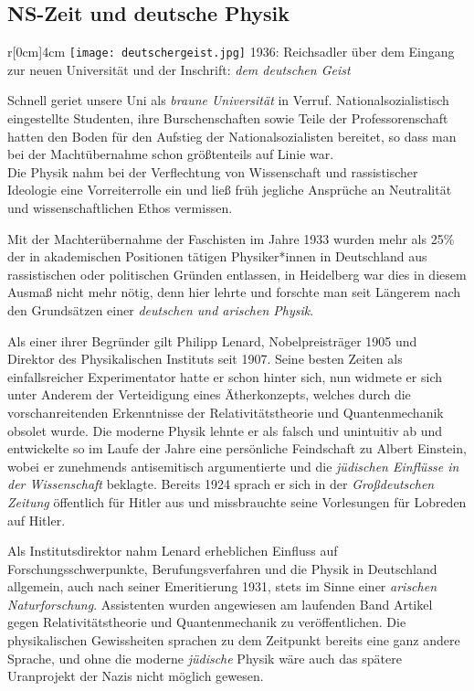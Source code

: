 \subsection*{NS-Zeit und deutsche Physik}
\begin{wrapfigure}{r}[0cm]{4cm}
\vspace{-13pt}
\texttt{[image: deutschergeist.jpg]}
\small{1936: Reichsadler über dem Eingang zur neuen Universität und der Inschrift: \textit{dem deutschen Geist}}
\vspace{-15pt}
\end{wrapfigure}

Schnell geriet unsere Uni als \textit{braune Universität} in Verruf. Nationalsozialistisch eingestellte Studenten, ihre Burschenschaften sowie Teile der Professorenschaft hatten den Boden für den Aufstieg der Nationalsozialisten bereitet, so dass man bei der Machtübernahme schon größtenteils auf Linie war.\\
Die Physik nahm bei der Verflechtung von Wissenschaft und rassistischer Ideologie eine Vorreiterrolle ein und ließ früh jegliche Ansprüche an Neutralität und wissenschaftlichen Ethos vermissen.

Mit der Machterübernahme der Faschisten im Jahre 1933 wurden mehr als 25\% der in akademischen Positionen tätigen Physiker*innen in Deutschland aus rassistischen oder politischen Gründen entlassen, in Heidelberg war dies in diesem Ausmaß nicht mehr nötig, denn hier lehrte und forschte man seit Längerem nach den Grundsätzen einer \textit{deutschen und arischen Physik}.

Als einer ihrer Begründer gilt Philipp Lenard, Nobelpreisträger 1905 und Direktor des Physikalischen Instituts seit 1907. 
Seine besten Zeiten als einfallsreicher Experimentator hatte er schon hinter sich, nun widmete er sich unter Anderem der Verteidigung eines Ätherkonzepts, welches durch die vorschanreitenden Erkenntnisse der Relativitätstheorie und Quantenmechanik obsolet wurde. Die moderne Physik lehnte er als falsch und unintuitiv ab und entwickelte so im Laufe der Jahre eine persönliche Feindschaft zu Albert Einstein, wobei er zunehmends antisemitisch argumentierte und die \textit{jüdischen Einflüsse in der Wissenschaft} beklagte. Bereits 1924 sprach er sich in der \textit{Großdeutschen Zeitung} öffentlich für Hitler aus und missbrauchte seine Vorlesungen für Lobreden auf Hitler.

Als Institutsdirektor nahm Lenard erheblichen Einfluss auf Forschungsschwerpunkte, Berufungsverfahren und die Physik in Deutschland allgemein, auch nach seiner Emeritierung 1931, stets im Sinne einer \textit{arischen Naturforschung}. Assistenten wurden angewiesen am laufenden Band Artikel gegen Relativitätstheorie und Quantenmechanik zu veröffentlichen. Die physikalischen Gewissheiten sprachen zu dem Zeitpunkt bereits eine ganz andere Sprache, und ohne die moderne \textit{jüdische} Physik wäre auch das spätere Uranprojekt der Nazis nicht möglich gewesen. 

